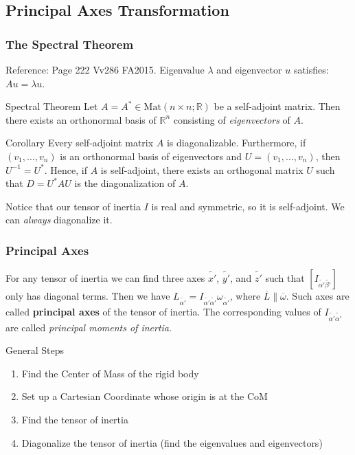 \subsection{Principal Axes Transformation}
\begin{frame}
\frametitle{The Spectral Theorem}
Reference: Page 222 Vv286 FA2015. Eigenvalue $\lambda$ and eigenvector $u$ satisfies: $Au=\lambda u$.
\begin{block}{Spectral Theorem}
Let $A=A^{*}\in\mathrm{Mat}(n\times n;\mathbb{R})$ be a self-adjoint matrix. Then there exists an \alert{orthonormal basis} of $\mathbb{R}^n$ consisting of \emph{eigenvectors} of $A$.
\end{block}
\begin{block}{Corollary}
Every self-adjoint matrix $A$ is diagonalizable. Furthermore, if $(v_1,\dots,v_n)$ is an \alert{orthonormal basis of eigenvectors} and $U=(v_1,\dots,v_n)$, then $U^{-1}=U^{*}$. Hence, if $A$ is self-adjoint, there exists an \alert{orthogonal matrix} $U$ such that $D=U^* AU$ is the diagonalization of $A$.
\end{block}
Notice that our tensor of inertia $I$ is \alert{real and symmetric}, so it is self-adjoint. We can \emph{always} diagonalize it.
\end{frame}
\begin{frame}
\frametitle{Principal Axes}
\begin{definition}
For any tensor of inertia we can find three axes $\tilde{x'}$, $\tilde{y'}$, and $\tilde{z'}$ such that $[I_{\tilde{\alpha'}\tilde{\beta'}}]$ only has diagonal terms. Then we have $L_{\tilde{\alpha'}}=I_{\tilde{\alpha'}\tilde{\alpha'}}\omega_{\tilde{\alpha'}}$, where $\overline L\parallel \overline\omega$. Such axes are called \textbf{\alert{principal axes}} of the tensor of inertia. The corresponding values of $I_{\tilde{\alpha'}\tilde{\alpha'}}$ are called \emph{principal moments of inertia}.
\end{definition}
\begin{block}{General Steps}
\begin{enumerate}
\item{Find the Center of Mass of the rigid body}
\item{Set up a Cartesian Coordinate whose origin is at the CoM}
\item{Find the tensor of inertia}
\item{Diagonalize the tensor of inertia (find the eigenvalues and eigenvectors)}
\end{enumerate}
\end{block}
\end{frame}
